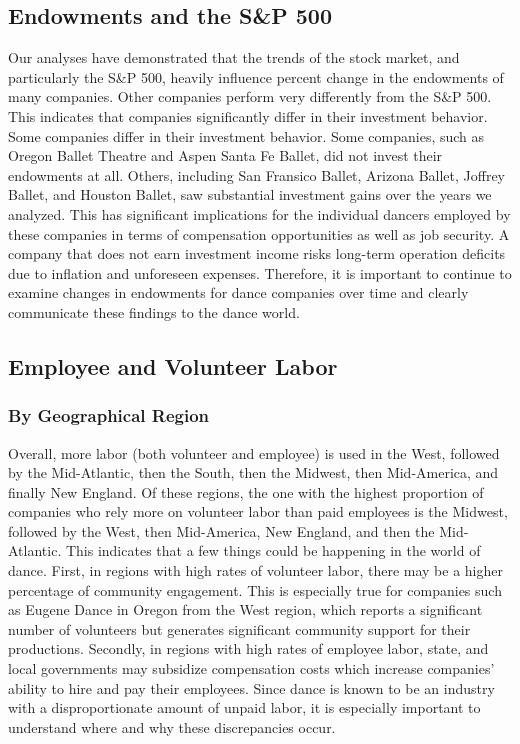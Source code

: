 \documentclass[Dance Data
Project,article,submit,moreauthors,pdftex]{mdpi}
\begin{document}
\hypertarget{endowments-and-the-sp-500}{%
\subsection{Endowments and the S\&P
500}\label{endowments-and-the-sp-500}}

Our analyses have demonstrated that the trends of the stock market, and
particularly the S\&P 500, heavily influence percent change in the
endowments of many companies. Other companies perform very differently
from the S\&P 500. This indicates that companies significantly differ in
their investment behavior. Some companies differ in their investment
behavior. Some companies, such as Oregon Ballet Theatre and Aspen Santa
Fe Ballet, did not invest their endowments at all. Others, including San
Fransico Ballet, Arizona Ballet, Joffrey Ballet, and Houston Ballet, saw
substantial investment gains over the years we analyzed. This has
significant implications for the individual dancers employed by these
companies in terms of compensation opportunities as well as job
security. A company that does not earn investment income risks long-term
operation deficits due to inflation and unforeseen expenses. Therefore,
it is important to continue to examine changes in endowments for dance
companies over time and clearly communicate these findings to the dance
world.

\hypertarget{employee-and-volunteer-labor}{%
\subsection{Employee and Volunteer
Labor}\label{employee-and-volunteer-labor}}

\hypertarget{by-geographical-region}{%
\subsubsection{By Geographical Region}\label{by-geographical-region}}

Overall, more labor (both volunteer and employee) is used in the West,
followed by the Mid-Atlantic, then the South, then the Midwest, then
Mid-America, and finally New England. Of these regions, the one with the
highest proportion of companies who rely more on volunteer labor than
paid employees is the Midwest, followed by the West, then Mid-America,
New England, and then the Mid-Atlantic. This indicates that a few things
could be happening in the world of dance. First, in regions with high
rates of volunteer labor, there may be a higher percentage of community
engagement. This is especially true for companies such as Eugene Dance
in Oregon from the West region, which reports a significant number of
volunteers but generates significant community support for their
productions. Secondly, in regions with high rates of employee labor,
state, and local governments may subsidize compensation costs which
increase companies' ability to hire and pay their employees. Since dance
is known to be an industry with a disproportionate amount of unpaid
labor, it is especially important to understand where and why these
discrepancies occur.
\end{document}

